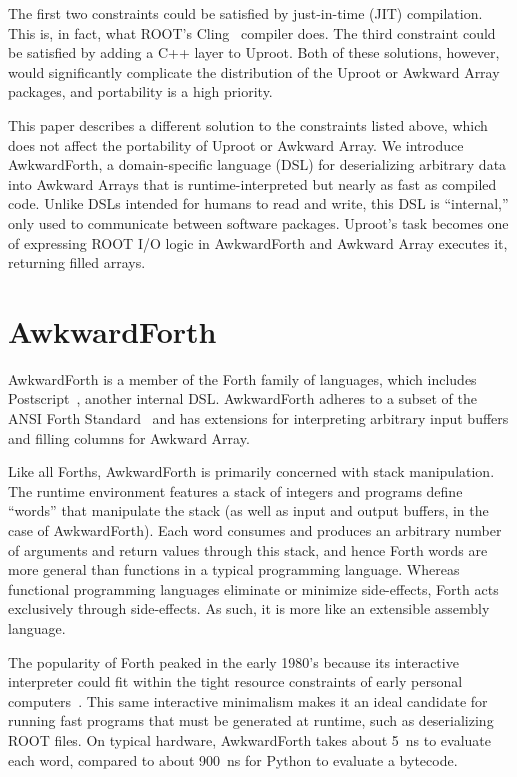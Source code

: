 \documentclass{webofc}
\begin{document}
The first two constraints could be satisfied by just-in-time (JIT) compilation. This is, in fact, what ROOT's Cling~\cite{cling} compiler does. The third constraint could be satisfied by adding a C++ layer to Uproot. Both of these solutions, however, would significantly complicate the distribution of the Uproot or Awkward Array packages, and portability is a high priority.

This paper describes a different solution to the constraints listed above, which does not affect the portability of Uproot or Awkward Array. We introduce AwkwardForth, a domain-specific language (DSL) for deserializing arbitrary data into Awkward Arrays that is runtime-interpreted but nearly as fast as compiled code. Unlike DSLs intended for humans to read and write, this DSL is ``internal,'' only used to communicate between software packages. Uproot's task becomes one of expressing ROOT I/O logic in AwkwardForth and Awkward Array executes it, returning filled arrays.

\section{AwkwardForth}

AwkwardForth is a member of the Forth family of languages, which includes Postscript~\cite{postscript}, another internal DSL. AwkwardForth adheres to a subset of the ANSI Forth Standard~\cite{forth-standard} and has extensions for interpreting arbitrary input buffers and filling columns for Awkward Array.

Like all Forths, AwkwardForth is primarily concerned with stack manipulation. The runtime environment features a stack of integers and programs define ``words'' that manipulate the stack (as well as input and output buffers, in the case of AwkwardForth). Each word consumes and produces an arbitrary number of arguments and return values through this stack, and hence Forth words are more general than functions in a typical programming language. Whereas functional programming languages eliminate or minimize side-effects, Forth acts exclusively through side-effects. As such, it is more like an extensible assembly language.

The popularity of Forth peaked in the early 1980's because its interactive interpreter could fit within the tight resource constraints of early personal computers~\cite{forth}. This same interactive minimalism makes it an ideal candidate for running fast programs that must be generated at runtime, such as deserializing ROOT files. On typical hardware, AwkwardForth takes about 5~ns to evaluate each word, compared to about 900~ns for Python to evaluate a bytecode.
\end{document}
